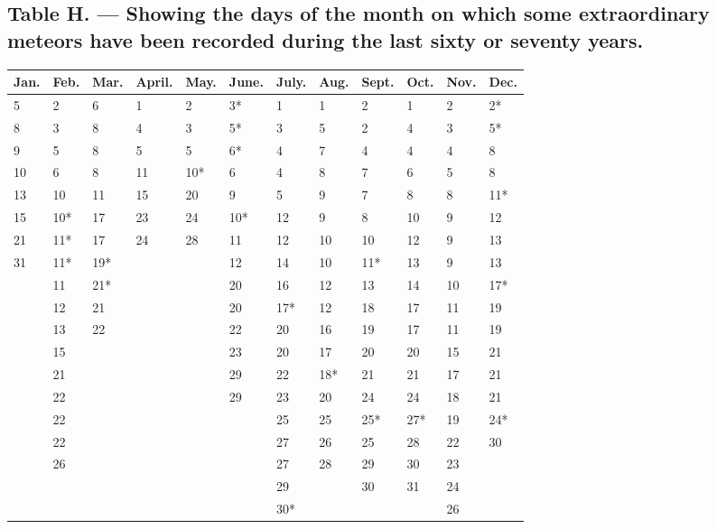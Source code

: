 \documentclass[a4paper, 12pt, oneside]{article}
\begin{document}
\subsection{Table H. --- Showing the days of the month on which some extraordinary meteors have been recorded during the last sixty or seventy years.}
\begin{table}[H]
    \centering
    \bfseries
    \Fontauri
    \footnotesize
    \begin{tabular}{|l|l|l|l|l|l|l|l|l|l|l|l|}
    \hline
        Jan. & Feb. & Mar. & April. & May. & June. & July. & Aug. & Sept. & Oct. & Nov. & Dec. \\ \hline
        5 & 2 & 6 & 1 & 2 & 3* & 1 & 1 & 2 & 1 & 2 & 2* \\
        8 & 3 & 8 & 4 & 3 & 5* & 3 & 5 & 2 & 4 & 3 & 5* \\
        9 & 5 & 8 & 5 & 5 & 6* & 4 & 7 & 4 & 4 & 4 & 8 \\
        10 & 6 & 8 & 11 & 10* & 6 & 4 & 8 & 7 & 6 & 5 & 8 \\
        13 & 10 & 11 & 15 & 20 & 9 & 5 & 9 & 7 & 8 & 8 & 11* \\
        15 & 10* & 17 & 23 & 24 & 10* & 12 & 9 & 8 & 10 & 9 & 12 \\
        21 & 11* & 17 & 24 & 28 & 11 & 12 & 10 & 10 & 12 & 9 & 13 \\
        31 & 11* & 19* & ~ & ~ & 12 & 14 & 10 & 11* & 13 & 9 & 13 \\
        ~ & 11 & 21* & ~ & ~ & 20 & 16 & 12 & 13 & 14 & 10 & 17* \\
        ~ & 12 & 21 & ~ & ~ & 20 & 17* & 12 & 18 & 17 & 11 & 19 \\
        ~ & 13 & 22 & ~ & ~ & 22 & 20 & 16 & 19 & 17 & 11 & 19 \\
        ~ & 15 & ~ & ~ & ~ & 23 & 20 & 17 & 20 & 20 & 15 & 21 \\
        ~ & 21 & ~ & ~ & ~ & 29 & 22 & 18* & 21 & 21 & 17 & 21 \\
        ~ & 22 & ~ & ~ & ~ & 29 & 23 & 20 & 24 & 24 & 18 & 21 \\
        ~ & 22 & ~ & ~ & ~ & ~ & 25 & 25 & 25* & 27* & 19 & 24* \\
        ~ & 22 & ~ & ~ & ~ & ~ & 27 & 26 & 25 & 28 & 22 & 30 \\
        ~ & 26 & ~ & ~ & ~ & ~ & 27 & 28 & 29 & 30 & 23 & ~ \\
        ~ & ~ & ~ & ~ & ~ & ~ & 29 & ~ & 30 & 31 & 24 & ~ \\
        ~ & ~ & ~ & ~ & ~ & ~ & 30* & ~ & ~ & ~ & 26 & ~ \\

\end{tabular}
\end{table}
\end{document}
